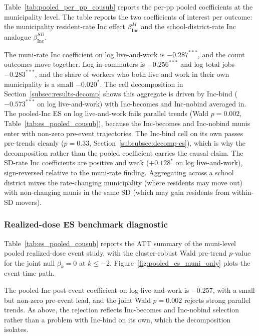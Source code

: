 \documentclass[12pt]{article}
\begin{document}
Table~\ref{tab:pooled_per_pp_cousub} reports the per-pp pooled
coefficients at the municipality level. The table reports the two
coefficients of interest per outcome: the municipality resident-rate
Inc effect $\beta^M_{\text{Inc}}$ and the school-district-rate Inc
analogue $\beta^{SD}_{\text{Inc}}$.



The muni-rate Inc coefficient on log live-and-work is
$-0.287^{***}$, and the count outcomes move together. Log
in-commuters is $-0.256^{***}$ and log total jobs $-0.283^{***}$,
and the share of workers who both live and work in their own
municipality is a small $-0.020^{*}$. The cell decomposition in
Section~\ref{subsec:results-decomp} shows this aggregate is driven
by Inc-bind ($-0.573^{***}$ on log live-and-work) with Inc-becomes
and Inc-nobind averaged in. The pooled-Inc ES on log live-and-work
fails parallel trends (Wald $p=0.002$, Table~\ref{tab:es_pooled_cousub}),
because the Inc-becomes and Inc-nobind munis enter with non-zero
pre-event trajectories. The Inc-bind cell on its own passes
pre-trends cleanly ($p=0.33$, Section~\ref{subsubsec:decomp-es}),
which is why the decomposition rather than the pooled coefficient
carries the causal claim. The SD-rate Inc coefficients are positive
and weak ($+0.128^{*}$ on log live-and-work), sign-reversed relative
to the muni-rate finding. Aggregating across a school district mixes
the rate-changing municipality (where residents may move out) with
non-changing munis in the same SD (which may gain residents from
within-SD movers).

\subsubsection{Realized-dose ES benchmark diagnostic}
\label{subsubsec:pooled-es}

Table~\ref{tab:es_pooled_cousub} reports the ATT summary of the
muni-level pooled realized-dose event study, with the
cluster-robust Wald pre-trend $p$-value for the joint null
$\beta_k = 0$ at $k \leq -2$.
Figure~\ref{fig:pooled_es_muni_only} plots the event-time path.



The pooled-Inc post-event coefficient on log live-and-work is
$-0.257$, with a small but non-zero pre-event lead, and the joint
Wald $p=0.002$ rejects strong parallel trends. As above, the rejection
reflects Inc-becomes and Inc-nobind selection rather than a problem
with Inc-bind on its own, which the decomposition isolates.
\end{document}
